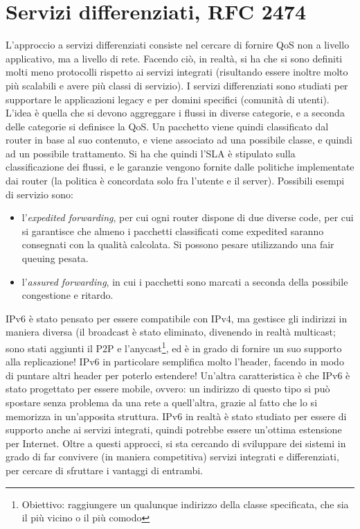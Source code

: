 \section{Servizi differenziati, RFC 2474}
L'approccio a servizi differenziati consiste nel cercare di fornire QoS non a
livello applicativo, ma a livello di
rete. Facendo ciò, in realtà, si ha che si sono definiti molti meno protocolli
rispetto ai servizi integrati
(risultando essere inoltre molto più scalabili e avere più classi di servizio).
I servizi differenziati sono studiati per supportare le applicazioni legacy e
per domini specifici (comunità di utenti). L'idea è quella che si devono
aggreggare i flussi in diverse categorie, e a seconda delle categorie si
definisce la QoS. Un pacchetto viene quindi classificato dal router in base al
suo contenuto, e viene associato ad una possibile classe, e quindi ad un
possibile trattamento.
Si ha che quindi l'SLA è stipulato sulla classificazione dei flussi, e le
garanzie vengono fornite dalle politiche
implementate dai router (la politica è concordata solo fra l'utente e il
server).
Possibili esempi di servizio sono:
\begin{itemize}
 \item l'\textit{expedited forwarding}, per cui ogni router dispone di due
diverse code, per cui si garantisce che
 almeno i pacchetti classificati come expedited saranno consegnati con la
qualità calcolata. Si possono pesare
 utilizzando una fair queuing pesata.
 \item l'\textit{assured forwarding}, in cui i pacchetti sono marcati a seconda
della possibile congestione e ritardo.
\end{itemize}
IPv6 è stato pensato per essere compatibile con IPv4, ma gestisce gli indirizzi
in maniera diversa (il broadcast è
stato eliminato, divenendo in realtà multicast; sono stati aggiunti il P2P e
l'anycast\footnote{Obiettivo: raggiungere un qualunque indirizzo della classe
specificata, che sia il più vicino o il più comodo}, ed è in grado di fornire un
suo supporto alla replicazione! IPv6 in particolare semplifica molto l'header,
facendo in modo di puntare altri header per poterlo estendere! Un'altra
caratteristica è che IPv6 è stato progettato per essere mobile, ovvero: un
indirizzo di questo tipo si può spostare senza problema da una rete a
quell'altra, grazie al fatto che lo si memorizza in
un'apposita struttura. IPv6 in realtà è stato studiato per essere di supporto
anche ai servizi integrati, quindi
potrebbe essere un'ottima estensione per Internet.
Oltre a questi approcci, si sta cercando di sviluppare dei sistemi in grado di
far convivere (in maniera competitiva)
servizi integrati e differenziati, per cercare di sfruttare i vantaggi di
entrambi.